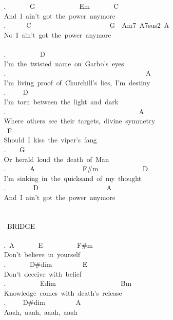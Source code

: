 {.\ \ \ \ \ \ \ G\ \ \ \ \ \ \ \ \ \ \ \ \ Em\ \ \ \ \ \ \ C\\
And\ I\ ain't\ got\ the\ power\ anymore\\
.\ \ \ \ \ \ C\ \ \ \ \ \ \ \ \ \ \ \ \ \ \ \ \ \ \ \ \ \ \ G\ \ Am7\ A7sus2\ A\\
No\ I\ ain't\ got\ the\ power\ anymore\\
\\
.\ \ \ \ \ \ \ \ \ \ D\\
I'm\ the\ twisted\ name\ on\ Garbo's\ eyes\\
.\ \ \ \ \ \ \ \ \ \ \ \ \ \ \ \ \ \ \ \ \ \ \ \ \ \ \ \ \ \ \ \ \ \ \ \ \ \ \ \ \ A\\
I'm\ living\ proof\ of\ Churchill's\ lies,\ I'm\ destiny\\
.\ \ \ \ \ D\\
I'm\ torn\ between\ the\ light\ and\ dark\\
.\ \ \ \ \ \ \ \ \ \ \ \ \ \ \ \ \ \ \ \ \ \ \ \ \ \ \ \ \ \ \ \ \ \ \ \ \ \ \ A\\
Where\ others\ see\ their\ targets,\ divine\ symmetry\\
\ F\\
Should\ I\ kiss\ the\ viper's\ fang\\
.\ \ \ \ G\\
Or\ herald\ loud\ the\ death\ of\ Man\\
.\ \ \ \ \ \ \ A\ \ \ \ \ \ \ \ \ \ \ \ \ \ F\#m\ \ \ \ \ \ \ \ \ \ \ \ \ D\\
I'm\ sinking\ in\ the\ quicksand\ of\ my\ thought\\
.\ \ \ \ \ \ \ \ D\ \ \ \ \ \ \ \ \ \ \ \ \ \ \ \ \ \ \ \ A\\
And\ I\ ain't\ got\ the\ power\ anymore\\
\\
\\
\lbrack\ BRIDGE\rbrack\\
\\
.\ A\ \ \ \ \ \ \ E\ \ \ \ \ \ \ \ \ \ F\#m\\
Don't\ believe\ in\ yourself\\
.\ \ \ \ \ \ \ D\#dim\ \ \ \ \ \ \ \ \ E\\
Don't\ deceive\ with\ belief\\
.\ \ \ \ \ \ \ \ \ \ Edim\ \ \ \ \ \ \ \ \ \ \ \ \ \ \ \ \ \ \ Bm\\
Knowledge\ comes\ with\ death's\ release\\
.\ \ \ \ \ D\#dim\ \ \ \ \ \ \ \ \ A\\
Aaah,\ aaah,\ aaah,\ aaah\\
}

